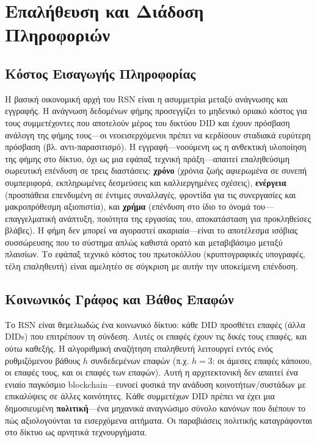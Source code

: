 \documentclass[11pt,a4paper,twocolumn]{article}
\begin{document}
\section{Επαλήθευση και Διάδοση Πληροφοριών}

\subsection{Κόστος Εισαγωγής Πληροφορίας}

Η βασική οικονομική αρχή του RSN είναι η ασυμμετρία μεταξύ ανάγνωσης και εγγραφής. Η ανάγνωση δεδομένων φήμης προσεγγίζει το μηδενικό οριακό κόστος για τους συμμετέχοντες που αποτελούν μέρος του δικτύου DID και έχουν πρόσβαση ανάλογη της φήμης τους---οι νεοεισερχόμενοι πρέπει να κερδίσουν σταδιακά ευρύτερη πρόσβαση (βλ. αντι-παρασιτισμό). Η εγγραφή---νοούμενη ως η ανθεκτική υλοποίηση της φήμης στο δίκτυο, όχι ως μια εφάπαξ τεχνική πράξη---απαιτεί επαληθεύσιμη σωρευτική επένδυση σε τρεις διαστάσεις: \textbf{χρόνο} (χρόνια ζωής αφιερωμένα σε συνεπή συμπεριφορά, εκπληρωμένες δεσμεύσεις και καλλιεργημένες σχέσεις), \textbf{ενέργεια} (προσπάθεια επενδυμένη σε έντιμες συναλλαγές, φροντίδα για τις συνεργασίες και μακροπρόθεσμη αξιοπιστία), και \textbf{χρήμα} (επένδυση στο ίδιο το όνομά του---επαγγελματική ανάπτυξη, ποιότητα της εργασίας του, αποκατάσταση για προκληθείσες βλάβες). Η φήμη δεν μπορεί να αγοραστεί ακαριαία---είναι το αποτέλεσμα ισόβιας συσσώρευσης που το σύστημα απλώς καθιστά ορατό και μεταβιβάσιμο μεταξύ πλαισίων. Το εφάπαξ τεχνικό κόστος του πρωτοκόλλου (κρυπτογραφικές υπογραφές, τέλη επαληθευτή) είναι αμελητέο σε σύγκριση με αυτήν την υποκείμενη επένδυση.

\subsection{Κοινωνικός Γράφος και Βάθος Επαφών}

Το RSN είναι θεμελιωδώς ένα κοινωνικό δίκτυο: κάθε DID προσθέτει επαφές (άλλα DIDs) που επιτρέπουν τη σύνδεση. Αυτές οι επαφές έχουν τις δικές τους επαφές, και ούτω καθεξής. Η αλγοριθμική αναζήτηση επαληθευτή λειτουργεί εντός ενός ρυθμιζόμενου βάθους $h$ συνδεδεμένων επαφών (π.χ. $h=3$: οι άμεσες επαφές κάποιου, οι επαφές τους, και οι επαφές των επαφών). Αυτή η αρχιτεκτονική δεν απαιτεί ένα ενιαίο παγκόσμιο blockchain---ευνοεί φυσικά την ανάδυση κοινοτήτων/συστάδων με επικαλύψεις σε άλλες κοινότητες. Κάθε συμμετέχων DID πρέπει να έχει μια δημοσιευμένη \textbf{πολιτική}---ένα μηχανικά αναγνώσιμο σύνολο κανόνων που διέπουν το πώς αξιολογούνται τα εισερχόμενα αιτήματα. Οι παραβιάσεις πολιτικής καταγράφονται στο δίκτυο ως αρνητικά τεχνουργήματα.
\end{document}

